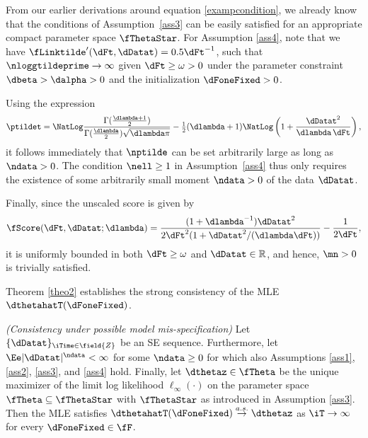 \begin{exmc} %
From our earlier derivations around equation \eqref{exampcondition}, we already know that the conditions of Assumption~\ref{ass3} can be easily satisfied for an appropriate compact parameter space $\fThetaStar$.
For Assumption \ref{ass4}, note that we have $\fLinktilde'(\dFt,\dDatat) = 0.5\dFt^{-1}$, such that $\nloggtildeprime\to\infty$ given $\dFt \geq \omega > 0$ under the parameter constraint  $\dbeta>\dalpha>0$ and the initialization $\dFoneFixed>0$. 

Using the expression 
\[
	\ptildet = 
	\NatLog \frac{\Gamma(\frac{\dlambda+1}{2})}{\Gamma(\frac{\dlambda}{2})\sqrt{\dlambda\pi}}
	- \tfrac12(\dlambda+1)
	\NatLog\left(1 + \frac{\dDatat^2}{\dlambda \, \dFt}\right),
\]
it follows immediately that $\nptilde$ can be set arbitrarily large as long as $\ndata>0$. 
The condition $\nell\geq 1$ in Assumption~\ref{ass4} thus only requires the existence of some arbitrarily small moment $\ndata>0$ of the data $\dDatat$.

Finally, since the unscaled score is given by
\begin{equation*}
	\fScore(\dFt,\dDatat;\dlambda)  = 
	\frac{(1+\dlambda^{-1})\dDatat^2}
	{2\dFt^{2}(1+ \dDatat^2/(\dlambda\dFt))} - \frac{1}{2\dFt},
\end{equation*}
it is uniformly bounded in both $\dFt \geq \omega$ and $\dDatat \in \mathbb{R}$, and hence,  $\mn>0$ is trivially satisfied.   

\end{exmc}



Theorem \ref{theo2} establishes the strong consistency of the MLE $\dthetahatT(\dFoneFixed)$.

\begin{theo} \label{theo2}
\emph{(Consistency under possible model mis-specification)}
Let $\{\dDatat\}_{\iTime \in \field{Z}}$ be an SE sequence.
Furthermore, let $\Ee|\dDatat|^{\ndata}<\infty$ for some $\ndata\geq 0$ for which also Assumptions \ref{ass1}, \ref{ass2}, \ref{ass3}, and \ref{ass4} hold. 
Finally, let  $\dthetaz \in \fTheta$ be the unique maximizer of the limit log likelihood $\ell_{\infty}(\cdot)$ on the parameter space $\fTheta \subseteq \fThetaStar$ with $\fThetaStar$ as introduced in Assumption \ref{ass3}. Then the MLE satisfies  $\dthetahatT(\dFoneFixed) \stackrel{a.s.}{\to}  \dthetaz$ as $\iT \to \infty$ for every $\dFoneFixed \in \fF$. 
\end{theo}


